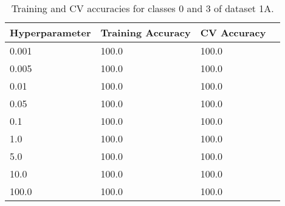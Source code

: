 \def\arraystretch{1.25}
\begin{table}[H]
{\small
\centering
\begin{tabular}{l l l c}
\hline
\hline
\textbf{Hyperparameter} & \textbf{Training Accuracy}  &  \textbf{CV Accuracy}\\
\hline
\hline
0.001 & 100.0 & 100.0\\
0.005 & 100.0 & 100.0\\
0.01 & 100.0 & 100.0\\
0.05 & 100.0 & 100.0\\
0.1 & 100.0 & 100.0\\
1.0 & 100.0 & 100.0\\
5.0 & 100.0 & 100.0\\
10.0 & 100.0 & 100.0\\
100.0 & 100.0 & 100.0\\
\hline

\end{tabular}

\caption{Training and CV accuracies for classes 0 and 3 of dataset 1A.}
}
\end{table}